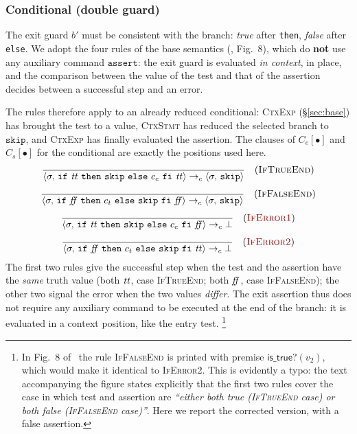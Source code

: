 \subsubsection{Conditional (double guard)}
\label{sec:if}
The exit guard $b'$ must be consistent with the branch: \emph{true} after
\texttt{then}, \emph{false} after \texttt{else}. We adopt the four rules
of the base semantics (\cite{LamiLaneseStefani2024}, Fig.~8), which do \textbf{not} use
any auxiliary command $\mathtt{assert}$: the exit guard is evaluated
\emph{in context}, in place, and the comparison between the value of the test and
that of the assertion decides between a successful step and an error.

\medskip
\noindent
The rules therefore apply to an already reduced conditional: \textsc{CtxExp}
(\S\ref{sec:base}) has brought the test to a value, \textsc{CtxStmt} has reduced
the selected branch to $\mathtt{skip}$, and \textsc{CtxExp} has finally evaluated
the assertion. The clauses of $C_e[\bullet]$ and $C_s[\bullet]$ for the
conditional are exactly the positions used here.
\[
\dfrac{}{\cfg{\mathtt{if}\ \ttt\ \mathtt{then}\ \mathtt{skip}\ \mathtt{else}\ c_e\ \mathtt{fi}\ \ttt}{\sigma}
       \toc \cfg{\mathtt{skip}}{\sigma}} \rname{IfTrueEnd}
\]
\[
\dfrac{}{\cfg{\mathtt{if}\ \ff\ \mathtt{then}\ c_t\ \mathtt{else}\ \mathtt{skip}\ \mathtt{fi}\ \ff}{\sigma}
       \toc \cfg{\mathtt{skip}}{\sigma}} \rname{IfFalseEnd}
\]
\[
\dfrac{}{\cfg{\mathtt{if}\ \ttt\ \mathtt{then}\ \mathtt{skip}\ \mathtt{else}\ c_e\ \mathtt{fi}\ \ff}{\sigma}
       \toc \bot} \rnameerr{IfError1}
\]
\[
\dfrac{}{\cfg{\mathtt{if}\ \ff\ \mathtt{then}\ c_t\ \mathtt{else}\ \mathtt{skip}\ \mathtt{fi}\ \ttt}{\sigma}
       \toc \bot} \rnameerr{IfError2}
\]
The first two rules give the successful step when the test and the assertion have the
\emph{same} truth value (both $\mathit{tt}$, case \textsc{IfTrueEnd};
both $\mathit{ff}$, case \textsc{IfFalseEnd}); the other two signal the error
when the two values \emph{differ}. The exit assertion thus does not
require any auxiliary command to be executed at the end of the branch: it is
evaluated in a context position, like the entry test.%
\footnote{In Fig.~8 of~\cite{LamiLaneseStefani2024} the rule
\textsc{IfFalseEnd} is printed with premise $\mathsf{is\_true?}(v_2)$, which
would make it identical to \textsc{IfError2}. This is evidently a
typo: the text accompanying the figure states explicitly that the first two
rules cover the case in which test and assertion are \emph{``either both true
\textup{(\textsc{IfTrueEnd}} case\textup{)} or both false
\textup{(\textsc{IfFalseEnd}} case\textup{)}''}. Here we report the
corrected version, with a false assertion.}


